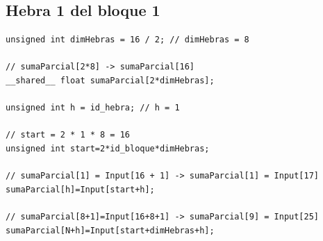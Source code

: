\documentclass[11pt,a4paper]{article}
\begin{document}
\subsection{Hebra 1 del bloque 1}

\begin{lstlisting}
unsigned int dimHebras = 16 / 2; // dimHebras = 8

// sumaParcial[2*8] -> sumaParcial[16]
__shared__ float sumaParcial[2*dimHebras];

unsigned int h = id_hebra; // h = 1

// start = 2 * 1 * 8 = 16
unsigned int start=2*id_bloque*dimHebras;

// sumaParcial[1] = Input[16 + 1] -> sumaParcial[1] = Input[17]
sumaParcial[h]=Input[start+h];

// sumaParcial[8+1]=Input[16+8+1] -> sumaParcial[9] = Input[25]
sumaParcial[N+h]=Input[start+dimHebras+h];
\end{lstlisting}
\end{document}
